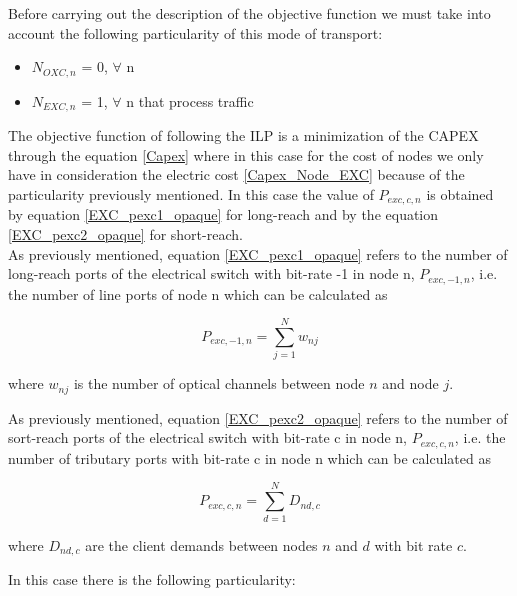 Before carrying out the description of the objective function we must take into account the following particularity of this mode of transport:
\begin{itemize}
  \item $N_{OXC,n}$ = 0, \quad $\forall$ n
  \item $N_{EXC,n}$ = 1, \quad $\forall$ n that process traffic
\end{itemize}

\vspace{11pt}
The objective function of following the ILP is a minimization of the CAPEX through the equation \ref{Capex} where in this case for the cost of nodes we only have in consideration the electric cost \ref{Capex_Node_EXC} because of the particularity previously mentioned.
In this case the value of $P_{exc,c,n}$ is obtained by equation \ref{EXC_pexc1_opaque} for long-reach and by the equation \ref{EXC_pexc2_opaque} for short-reach.\\

\newpage
As previously mentioned, equation \ref{EXC_pexc1_opaque} refers to the number of long-reach ports of the electrical switch with bit-rate -1 in node n, $P_{exc,-1,n}$, i.e. the number of line ports of node n which can be calculated as

\begin{equation}
P_{exc,-1,n} = \sum_{j=1}^{N} w_{nj}
\label{EXC_pexc1_opaque}
\end{equation}

\vspace{11pt}
where $w_{nj}$ is the number of optical channels between node $n$ and node $j$.

\vspace{11pt}
As previously mentioned, equation \ref{EXC_pexc2_opaque} refers to the number of sort-reach ports of the electrical switch with bit-rate c in node n, $P_{exc,c,n}$, i.e. the number of tributary ports with bit-rate c in node n which can be calculated as

\begin{equation}
P_{exc,c,n} = \sum_{d=1}^{N} D_{nd,c}
\label{EXC_pexc2_opaque}
\end{equation}

\vspace{11pt}
where $D_{nd,c}$ are the client demands between nodes $n$ and $d$ with bit rate $c$.

\vspace{11pt}
In this case there is the following particularity:

